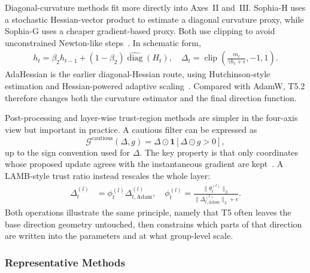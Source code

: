 Diagonal-curvature methods fit more directly into Axes~II and~III.  Sophia-H
uses a stochastic Hessian-vector product to estimate a diagonal curvature
proxy, while Sophia-G uses a cheaper gradient-based proxy.  Both use clipping
to avoid unconstrained Newton-like steps~\citep{liu2023sophia}.  In schematic
form,
\begin{equation}
\begin{aligned}
  h_t=\beta_2 h_{t-1}+(1-\beta_2)\widehat{\operatorname{diag}}(H_t), \quad
  \Delta_t=\operatorname{clip}\!\left(\frac{m_t}{\gamma h_t+\epsilon}, -1, 1\right).
\end{aligned}
\label{eq:t5-sophia-clipping}
\end{equation}
AdaHessian is the earlier diagonal-Hessian route, using Hutchinson-style
estimation and Hessian-powered adaptive scaling~\citep{yao2021adahessian}.
Compared with AdamW, T5.2 therefore changes both the curvature estimator and
the final direction function.

Post-processing and layer-wise trust-region methods are simpler in the
four-axis view but important in practice.  A cautious filter can be expressed
as
\begin{equation}
  \mathcal{G}^{\mathrm{cautious}}(\Delta,g)
  =
  \Delta \odot \mathbf{1}[\Delta\odot g > 0],
\label{eq:t5-cautious-filter}
\end{equation}
up to the sign convention used for $\Delta$.  The key property is that only
coordinates whose proposed update agrees with the instantaneous gradient are
kept~\citep{liang2024cautious}.  A LAMB-style trust ratio instead rescales
the whole layer:
\begin{equation}
\begin{aligned}
  \Delta_t^{(l)}
  &=
  \phi_t^{(l)}\Delta_{t,\mathrm{Adam}}^{(l)},
  \quad
  \phi_t^{(l)}
  =
  \frac{\|\theta_t^{(l)}\|_2}
       {\|\Delta_{t,\mathrm{Adam}}^{(l)}\|_2+\epsilon}.
\end{aligned}
\label{eq:t5-lamb-ratio}
\end{equation}
Both operations illustrate the same principle, namely that T5 often leaves the base
direction geometry untouched, then constrains which parts of that direction
are written into the parameters and at what group-level scale.

\subsubsection{Representative Methods}
\label{sec:t5-methods}

